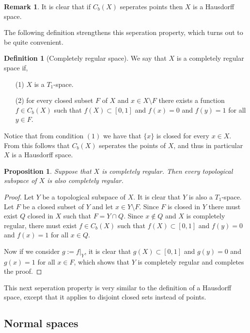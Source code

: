 \documentclass[11pt,a4paper]{article}
\theoremstyle{definition}
\newtheorem{definition}{Definition}[section]
\newtheorem{remark}{Remark}[section]
\theoremstyle{plain}
\newtheorem{proposition}[theorem]{Proposition}
\begin{document}
  \begin{remark}
    It is clear that if $C_b(X)$ seperates points then $X$ is a Hausdorff
    space.
  \end{remark}

  The following definition strengthens this seperation property, which
  turns out to be quite convenient.

  \begin{definition}[Completely regular space]
      We say that $X$ is a completely regular space if,
      \begin{itemize}
        \item[(1)] $X$ is a $T_1$-space.
        \item[(2)] for every closed subset $F$ of $X$ and $x \in X \setminus F$
          there exists a function $f \in C_b(X)$ such that $f(X) \subset [0,1]$ 
          and $f(x) = 0$ and $f(y) = 1$ for all $y \in F$.
      \end{itemize}
  \end{definition}

  Notice that from condition $(1)$ we have that $\{x\}$ is closed for every
  $x \in X$. From this follows that $C_b(X)$ seperates the points of $X$,
  and thus in particular $X$ is a Hausdorff space.

  \begin{proposition}
    Suppose that $X$ is completely regular. Then every topological subspace
    of $X$ is also completely regular.
  \end{proposition}
  \begin{proof}
    Let $Y$ be a topological subspace of $X$. It is clear that $Y$ is also
    a $T_1$-space. Let $F$ be a closed subset of $Y$ and let 
    $x \in Y \setminus F$. Since $F$ is closed in $Y$ there must exist
    $Q$ closed in $X$ such that $F = Y \cap Q$. Since $x \notin Q$ and
    $X$ is completely regular, there must exist $f \in C_b(X)$ such that
    $f(X) \subset [0,1]$ and $f(y) = 0$ and $f(x) = 1$ for all $x \in Q$.
    
    Now if we consider $g := f\vert_Y$, it is clear that
    $g(X) \subset [0,1]$ and $g(y) = 0$ and $g(x) = 1$ for all $x \in F$,
    which shows that $Y$ is completely regular and completes the proof.
  \end{proof}

  This next seperation property is very similar to the definition of a
  Hausdorff space, except that it applies to disjoint closed sets instead
  of points.

  \subsection{Normal spaces}
\end{document}
